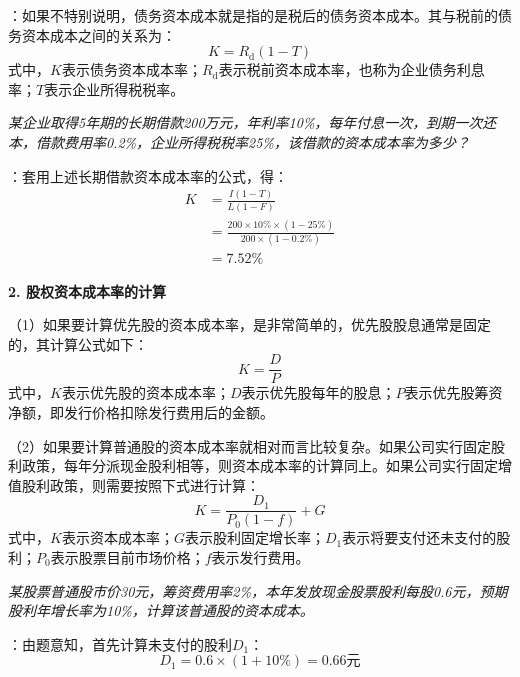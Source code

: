 \documentclass[
  10pt,
  twoside,
  openany,
  b5paper, %
  colorscheme = black, %
  xits = false,
]{qyxf-book}
\begin{document}
\analysis[注]：如果不特别说明，债务资本成本就是指的是税后的债务资本成本。其与税前的债务资本成本之间的关系为：
\begin{equation*}
	K = R_\mathrm{d}(1-T)
\end{equation*}
式中，$K$表示债务资本成本率；$R_\mathrm{d}$表示税前资本成本率，也称为企业债务利息率；$T$表示企业所得税税率。

\emph{某企业取得5年期的长期借款200万元，年利率10\%，每年付息一次，到期一次还本，借款费用率0.2\%，企业所得税税率25\%，该借款的资本成本率为多少？}

\solve[答]：套用上述长期借款资本成本率的公式，得：
\begin{equation*}
	\begin{aligned}
		K &= \frac{I(1-T)}{L(1-F)} \\[1.5ex]
		&= \frac{200 \times 10\% \times (1-25\%)}{200 \times (1-0.2\%)} \\[1.5ex]
		&=7.52\%
	\end{aligned}
\end{equation*}

\textbf{2. 股权资本成本率的计算}

（1）如果要计算优先股的资本成本率，是非常简单的，优先股股息通常是固定的，其计算公式如下：
\begin{equation*}
	K = \frac{D}{P}
\end{equation*}
式中，$K$表示优先股的资本成本率；$D$表示优先股每年的股息；$P$表示优先股筹资净额，即发行价格扣除发行费用后的金额。

（2）如果要计算普通股的资本成本率就相对而言比较复杂。如果公司实行固定股利政策，每年分派现金股利相等，则资本成本率的计算同上。如果公司实行固定增值股利政策，则需要按照下式进行计算：
\begin{equation*}
	K = \frac{D_1}{P_0(1-f)}+G
\end{equation*}
式中，$K$表示资本成本率；$G$表示股利固定增长率；$D_1$表示将要支付还未支付的股利；$P_0$表示股票目前市场价格；$f$表示发行费用。

\emph{某股票普通股市价30元，筹资费用率2\%，本年发放现金股票股利每股0.6元，预期股利年增长率为10\%，计算该普通股的资本成本。}

\solve[答]：由题意知，首先计算未支付的股利$D_1$：
\begin{equation*}
	D_1 = 0.6 \times (1+10\%) = 0.66\text{元}
\end{equation*}
\end{document}
